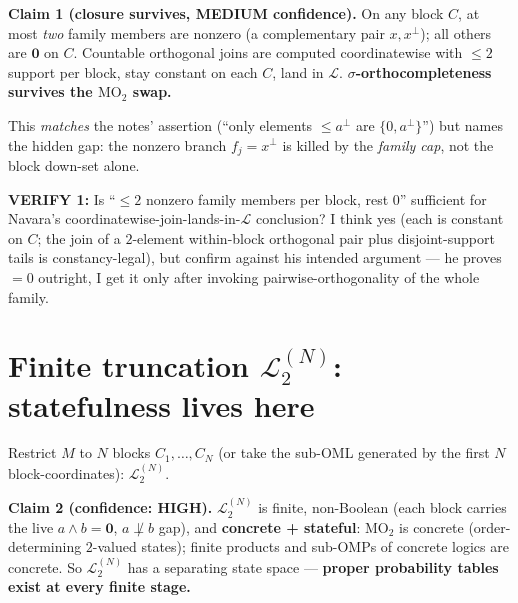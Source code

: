 \documentclass[11pt]{article}
\newcommand{\MOtwo}{\mathrm{MO}_2}
\newcommand{\Lt}{\mathcal{L}_2}
\newcommand{\Lcal}{\mathcal{L}}
\begin{document}
\begin{claimbox}
\noindent\textbf{Claim 1 (closure survives, MEDIUM confidence).} On any block
$C$, at most \emph{two} family members are nonzero (a complementary pair
$x,x^\perp$); all others are $\mathbf 0$ on $C$. Countable orthogonal joins are
computed coordinatewise with $\le2$ support per block, stay constant on each
$C$, land in $\Lcal$. \textbf{$\sigma$-orthocompleteness survives the $\MOtwo$
swap.}
\end{claimbox}

\noindent This \emph{matches} the notes' assertion (``only elements $\le
a^\perp$ are $\{0,a^\perp\}$'') but names the hidden gap: the nonzero branch
$f_j=x^\perp$ is killed by the \emph{family cap}, not the block down-set alone.

\begin{verify}
\noindent\textbf{VERIFY 1:} Is ``$\le2$ nonzero family members per block, rest
$0$'' sufficient for Navara's coordinatewise-join-lands-in-$\Lcal$ conclusion?
I think yes (each is constant on $C$; the join of a $2$-element within-block
orthogonal pair plus disjoint-support tails is constancy-legal), but confirm
against his intended argument --- he proves $=0$ outright, I get it only after
invoking pairwise-orthogonality of the whole family.
\end{verify}

\section{Finite truncation $\Lt^{(N)}$: statefulness lives here
  }

Restrict $M$ to $N$ blocks $C_1,\dots,C_N$ (or take the sub-OML generated by
the first $N$ block-coordinates): $\Lt^{(N)}$.

\begin{claimbox}
\noindent\textbf{Claim 2 (confidence: HIGH).} $\Lt^{(N)}$ is finite,
non-Boolean (each block carries the live $a\wedge b=\mathbf 0$, $a\not\perp b$
gap), and \textbf{concrete + stateful}: $\MOtwo$ is concrete (order-determining
$2$-valued states); finite products and sub-OMPs of concrete logics are
concrete. So $\Lt^{(N)}$ has a separating state space --- \textbf{proper
probability tables exist at every finite stage.}
\end{claimbox}
\end{document}

